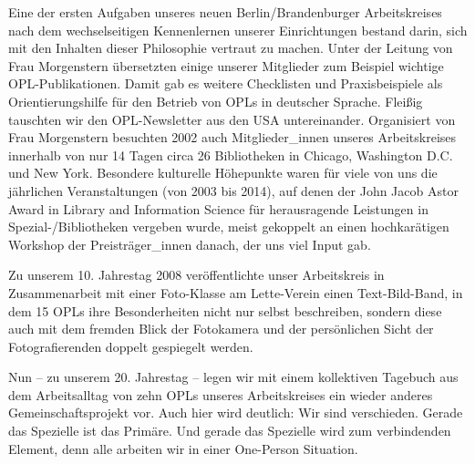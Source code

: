 \documentclass[a4paper,
fontsize=11pt,
oneside,
numbers=noperiodatend,
parskip=half-,
bibliography=totoc,
final
]{scrartcl}
\begin{document}
Eine der ersten Aufgaben unseres neuen Berlin/Brandenburger
Arbeitskreises nach dem wechselseitigen Kennenlernen unserer
Einrichtungen bestand darin, sich mit den Inhalten dieser Philosophie
vertraut zu machen. Unter der Leitung von Frau Morgenstern übersetzten
einige unserer Mitglieder zum Beispiel wichtige OPL-Publikationen. Damit
gab es weitere Checklisten und Praxisbeispiele als Orientierungshilfe
für den Betrieb von OPLs in deutscher Sprache. Fleißig tauschten wir den
OPL-Newsletter aus den USA untereinander. Organisiert von Frau
Morgenstern besuchten 2002 auch Mitglieder\_innen unseres Arbeitskreises
innerhalb von nur 14 Tagen circa 26 Bibliotheken in Chicago, Washington
D.C. und New York. Besondere kulturelle Höhepunkte waren für viele von
uns die jährlichen Veranstaltungen (von 2003 bis 2014), auf denen der
John Jacob Astor Award in Library and Information Science für
herausragende Leistungen in Spezial-/Bibliotheken vergeben wurde, meist
gekoppelt an einen hochkarätigen Workshop der Preisträger\_innen danach,
der uns viel Input gab.

Zu unserem 10. Jahrestag 2008 veröffentlichte unser Arbeitskreis in
Zusammenarbeit mit einer Foto-Klasse am Lette-Verein einen
Text-Bild-Band, in dem 15 OPLs ihre Besonderheiten nicht nur selbst
beschreiben, sondern diese auch mit dem fremden Blick der Fotokamera und
der persönlichen Sicht der Fotografierenden doppelt gespiegelt werden.

Nun -- zu unserem 20. Jahrestag -- legen wir mit einem kollektiven
Tagebuch aus dem Arbeitsalltag von zehn OPLs unseres Arbeitskreises ein
wieder anderes Gemeinschaftsprojekt vor. Auch hier wird deutlich: Wir
sind verschieden. Gerade das Spezielle ist das Primäre. Und gerade das
Spezielle wird zum verbindenden Element, denn alle arbeiten wir in einer
One-Person Situation.
\end{document}
